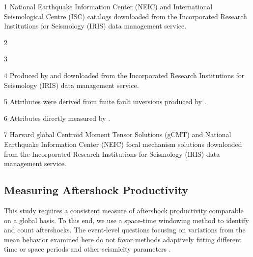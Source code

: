 \documentclass[draft, jgrga]{agujournal2018}
\begin{document}
\begin{table}[]
\begin{threeparttable}
    \begin{tablenotes}
        \item[1] National Earthquake Information Center (NEIC) and International Seismological Centre (ISC) catalogs downloaded from the Incorporated Research Institutions for Seismology (IRIS) data management service. 
        \item[2] \citet{Bird2003AnBoundaries}
        \item[3] \citet{Muller2008}
        \item[4] Produced by \citet{Convers2011GlobalMid2010} and downloaded from the Incorporated Research Institutions for Seismology (IRIS) data management service.
        \item[5] Attributes were derived from finite fault inversions produced by \citet{Hayes2017}.
        \item[6] Attributes directly measured by \citet{Hayes2017}.
        \item[7] Harvard global Centroid Moment Tensor Solutions (gCMT) and National Earthquake Information Center (NEIC) focal mechanism solutions downloaded from the Incorporated Research Institutions for Seismology (IRIS) data management service.

    \end{tablenotes}

\end{threeparttable}

\end{table}


   
    \subsection{Measuring Aftershock Productivity}
    
This study requires a consistent measure of aftershock productivity comparable on a global basis. To this end, we use a space-time windowing method to identify and count aftershocks. The event-level questions focusing on variations from the mean behavior examined here do not favor methods adaptively fitting different time or space periods and other seismicity parameters \citep[e.g.][]{ogata2017statistics}.  \citet{Zaliapin2008}  
\end{document}
